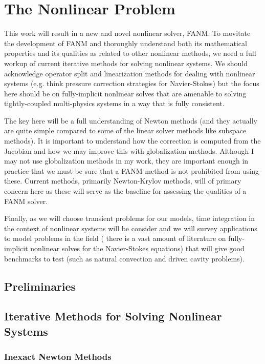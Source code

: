 \chapter{The Nonlinear Problem}
\label{ch:nonlinear_problem}

This work will result in a new and novel nonlinear solver, FANM. To
movitate the development of FANM and thoroughly understand both its
mathematical properties and its qualities as related to other
nonlinear methods, we need a full workup of current iterative methods
for solving nonlinear systems. We should acknowledge operator split
and linearization methods for dealing with nonlinear systems
(e.g. think pressure correction strategies for Navier-Stokes) but the
focus here should be on fully-implicit nonlinear solves that are
amenable to solving tightly-coupled multi-physics systems in a way that
is fully consistent.

The key here will be a full understanding of Newton methods (and they
actually are quite simple compared to some of the linear solver
methods like subspace methods). It is important to understand how the
correction is computed from the Jacobian and how we may improve this
with globalization methods. Although I may not use globalization
methods in my work, they are important enough in practice that we must
be sure that a FANM method is not prohibited from using these. Current
methods, primarily Newton-Krylov methods, will of primary concern here
as these will serve as the baseline for assessing the qualities of a
FANM solver. 

Finally, as we will choose transient problems for our models, time
integration in the context of nonlinear systems will be consider and
we will survey applications to model problems in the field ( there is
a vast amount of literature on fully-implicit nonlinear solves for the
Navier-Stokes equations) that will give good benchmarks to test (such
as natural convection and driven cavity problems).

\section{Preliminaries}
\label{sec:nonlinear_preliminaries}

\section{Iterative Methods for Solving Nonlinear Systems}
\label{sec:nonlinear_methods}

\subsection{Inexact Newton Methods}
\label{subsec:newton_methods}

